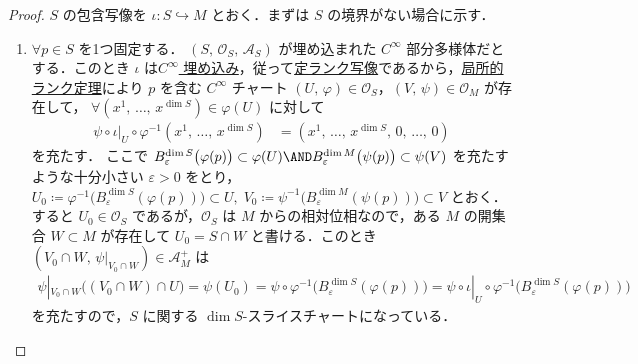 \documentclass[geometry_main]{subfiles}
\begin{document}
\begin{proof}
	$S$ の包含写像を $\iota \colon S \hookrightarrow M$ とおく．まずは $S$ の境界がない場合に示す．
	\begin{enumerate}
		\item $\forall p \in S$ を1つ固定する．
		$(S,\, \mathcal{O}_S,\, \mathcal{A}_S)$ が埋め込まれた $C^\infty$ 部分多様体だとする．このとき $\iota$ は\hyperref[def:submersion-smooth]{$C^\infty$ 埋め込み}，従って\hyperref[def:rank-smooth]{定ランク写像}であるから，\hyperref[thm:rank]{局所的ランク定理}により
		$p$ を含む $C^\infty$ チャート $(U,\, \varphi) \in \mathcal{O}_S$，$(V,\, \psi) \in \mathcal{O}_M$ が存在して，
		$\forall (x^1,\, \dots,\, x^{\dim S}) \in \varphi(U)$ に対して
		\begin{align}
			\psi \circ \iota|_U \circ \varphi^{-1}(x^1,\, \dots,\, x^{\dim S})
			&= (x^1,\, \dots,\, x^{\dim S},\, 0,\, \dots,\, 0)
		\end{align}
		を充たす．
		ここで $B_\varepsilon^{\dim S} \bigl( \varphi(p) \bigr)  \subset \varphi(U) \AND B_{\varepsilon}^{\dim M} \bigl( \psi(p) \bigr) \subset \psi(V)$ を充たすような十分小さい $\varepsilon > 0$ をとり，$U_0 \coloneqq \varphi^{-1} \bigl( B_\varepsilon^{\dim S} (\varphi(p)) \bigr) \subset U,\; V_0 \coloneqq \psi^{-1} \bigl( B_\varepsilon^{\dim M} (\psi(p)) \bigr) \subset V$ とおく．
		すると $U_0 \in \mathcal{O}_S$ であるが，$\mathcal{O}_S$ は $M$ からの相対位相なので，ある $M$ の開集合 $W \subset M$ が存在して $U_0 = S \cap W$ と書ける．このとき $(V_0 \cap W,\, \psi|_{V_0 \cap W}) \in \mathcal{A}_M^+$ は
		\begin{align}
			\psi|_{V_0 \cap W} \bigl((V_0 \cap W) \cap U\bigr) = \psi(U_0) = \psi \circ \varphi^{-1} \bigl( B_{\varepsilon}^{\dim S}(\varphi(p)) \bigr) = \psi \circ \iota|_U \circ \varphi^{-1} \bigl( B_{\varepsilon}^{\dim S}(\varphi(p)) \bigr) 
		\end{align}
		を充たすので，$S$ に関する $\dim S$-スライスチャートになっている．


\end{enumerate}
\end{proof}
\end{document}
